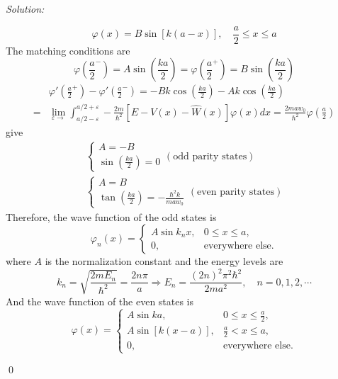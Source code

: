 \documentclass[10pt,a4paper]{article}
\newenvironment{sol}
    {\emph{Solution:}
    }
    {
    \qed
    }
\begin{document}
\begin{sol}
\begin{itemize}
\begin{equation}
\varphi(x)=B\sin[k(a-x)],\quad\frac{a}{2}\leq x\leq a
\end{equation}
The matching conditions are
\begin{equation}
\varphi(\frac{a}{2}^-)=A\sin\left(\frac{ka}{2}\right)=\varphi(\frac{a}{2}^+)=B\sin\left(\frac{ka}{2}\right)
\end{equation}
\begin{align}
\nonumber&\varphi'(\frac{a}{2}^+)-\varphi'(\frac{a}{2}^-)=-Bk\cos\left(\frac{ka}{2}\right)-Ak\cos\left(\frac{ka}{2}\right)\\
=&\lim_{\varepsilon\rightarrow}\int_{a/2-\varepsilon}^{a/2+\varepsilon}-\frac{2m}{\hbar^2}[E-V(x)-\hat{W}(x)]\varphi(x)dx=\frac{2maw_0}{\hbar^2}\varphi(\frac{a}{2})
\end{align}
give
\begin{gather}
\left\{\begin{array}{ll}
A=-B\\
\sin\left(\frac{ka}{2}\right)=0
\end{array}\right.(\text{odd parity states})\\
\left\{\begin{array}{ll}
A=B\\
\tan\left(\frac{ka}{2}\right)=-\frac{\hbar^2k}{maw_0}
\end{array}\right.(\text{even parity states})
\end{gather}
Therefore, the wave function of the odd states is
\begin{equation}
\varphi_n(x)=\left\{\begin{array}{ll}
A\sin k_nx,&0\leq x\leq a,\\
0,&\text{everywhere else.}
\end{array}\right.
\end{equation}
where $A$ is the normalization constant and the energy levels are
\begin{equation}
k_n=\sqrt{\frac{2mE_n}{\hbar^2}}=\frac{2n\pi}{a}\Longrightarrow E_n=\frac{(2n)^2\pi^2\hbar^2}{2ma^2},\quad n=0,1,2,\cdots
\end{equation}
And the wave function of the even states is
\begin{equation}
\varphi(x)=\left\{\begin{array}{ll}
A\sin ka,&0\leq x\leq\frac{a}{2},\\
A\sin[k(x-a)],&\frac{a}{2}<x\leq a,\\
0,&\text{everywhere else.}
\end{array}\right.
\end{equation}

\end{itemize}
\end{sol}
\end{document}
